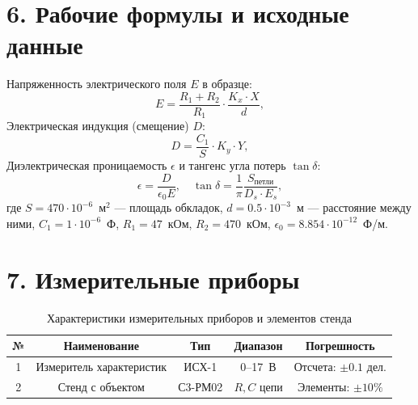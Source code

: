\documentclass[a4paper,12pt]{article}
\begin{document}
\section*{\hspace{30pt}6. Рабочие формулы и исходные данные}
\hspace{15pt} Напряженность электрического поля $E$ в образце:
\begin{equation}
    E = \frac{R_1 + R_2}{R_1} \cdot \frac{K_x \cdot X}{d},
    \label{eq:E_field}
\end{equation}
Электрическая индукция (смещение) $D$:
\begin{equation}
    D = \frac{C_1}{S} \cdot K_y \cdot Y,
    \label{eq:D_field}
\end{equation}
Диэлектрическая проницаемость $\epsilon$ и тангенс угла потерь $\tan \delta$:
\begin{equation}
    \epsilon = \frac{D}{\epsilon_0 E}, \quad \tan \delta = \frac{1}{\pi} \frac{S_{\text{петли}}}{D_s \cdot E_s},
    \label{eq:eps_tan}
\end{equation}
где $S = 470 \cdot 10^{-6}$~м$^2$ — площадь обкладок, $d = 0.5 \cdot 10^{-3}$~м — расстояние между ними, $C_1 = 1 \cdot 10^{-6}$~Ф, $R_1 = 47$~кОм, $R_2 = 470$~кОм, $\epsilon_0 = 8.854 \cdot 10^{-12}$~Ф/м.

\section*{\hspace{30pt}7. Измерительные приборы}
\begin{table}[H]
    \caption{Характеристики измерительных приборов и элементов стенда}
    \label{tab:devices}
    \centering
    \begin{tabular}{|c|c|c|c|c|}
        \hline
        № & Наименование & Тип & Диапазон & Погрешность \\ \hline
        1 & Измеритель характеристик & ИСХ-1 & 0--17~В & Отсчета: $\pm 0.1$ дел. \\ \hline
        2 & Стенд с объектом & С3-РМ02 & $R, C$ цепи & Элементы: $\pm 10\%$ \\ \hline
    \end{tabular}
\end{table}
\end{document}
